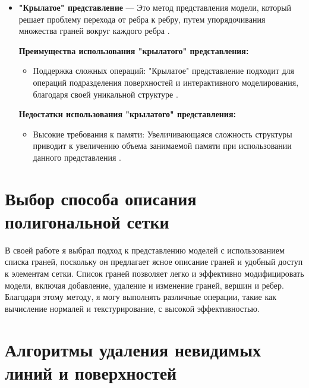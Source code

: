 \begin{itemize}
	\item \textbf{"Крылатое" представление} --- Это метод представления модели, который решает проблему перехода от ребра к ребру, путем упорядочивания множества граней вокруг каждого ребра \cite{polygon_mesh}.

	\textbf{Преимущества использования "крылатого" представления:}

	\begin{itemize}
		\item Поддержка сложных операций: "Крылатое" представление подходит для операций подразделения поверхностей и интерактивного моделирования, благодаря своей уникальной структуре \cite{polygon_mesh}.
		\end{itemize}

	\textbf{Недостатки использования "крылатого" представления:}

	\begin{itemize}
		\item Высокие требования к памяти: Увеличивающаяся сложность структуры приводит к увеличению объема занимаемой памяти при использовании данного представления \cite{polygon_mesh}.
	\end{itemize}
	
\end{itemize}

\section*{Выбор способа описания полигональной сетки} %

В своей работе я выбрал подход к представлению моделей с использованием списка граней, поскольку он предлагает ясное описание граней и удобный доступ к элементам сетки. Список граней позволяет легко и эффективно модифицировать модели, включая добавление, удаление и изменение граней, вершин и ребер. Благодаря этому методу, я могу выполнять различные операции, такие как вычисление нормалей и текстурирование, с высокой эффективностью.


\section{Алгоритмы удаления невидимых линий и поверхностей}

